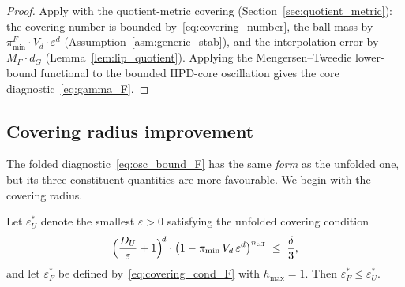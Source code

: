 \begin{proof}
  Apply \citet[Theorem~5.1]{LCNF} with the quotient-metric covering
  (Section~\ref{sec:quotient_metric}): the covering
  number is bounded by~\eqref{eq:covering_number}, the ball mass by
  $\pi_{\min}^F \cdot V_d \cdot \varepsilon^d$
  (Assumption~\ref{asm:generic_stab}), and the interpolation error by
  $M_F \cdot d_G$ (Lemma~\ref{lem:lip_quotient}).
  Applying the Mengersen--Tweedie lower-bound functional
  \citep{MengersenTweedie1996} to the bounded HPD-core
  oscillation gives the core diagnostic~\eqref{eq:gamma_F}.
\end{proof}


\subsection{Covering radius improvement}
\label{sec:covering_improvement}

The folded diagnostic~\eqref{eq:osc_bound_F} has the same
\emph{form} as the unfolded one, but its three constituent
quantities are more favourable.  We begin with the covering
radius.

\begin{theorem}\label{thm:eps_improvement}
  Let $\varepsilon_U^*$ denote the smallest $\varepsilon > 0$
  satisfying the unfolded covering condition
  \begin{equation}\label{eq:covering_cond_U}
    \Bigl(\frac{D_U}{\varepsilon} + 1\Bigr)^{\!d}
    \cdot
    \bigl(1 - \pi_{\min}\, V_d\, \varepsilon^d\bigr)^{n_{\mathrm{eff}}}
    \;\leq\; \frac{\delta}{3},
  \end{equation}
  and let $\varepsilon_F^*$ be defined
  by~\eqref{eq:covering_cond_F} with $h_{\max} = 1$.  Then
  $\varepsilon_F^* \leq \varepsilon_U^*$.
\end{theorem}

